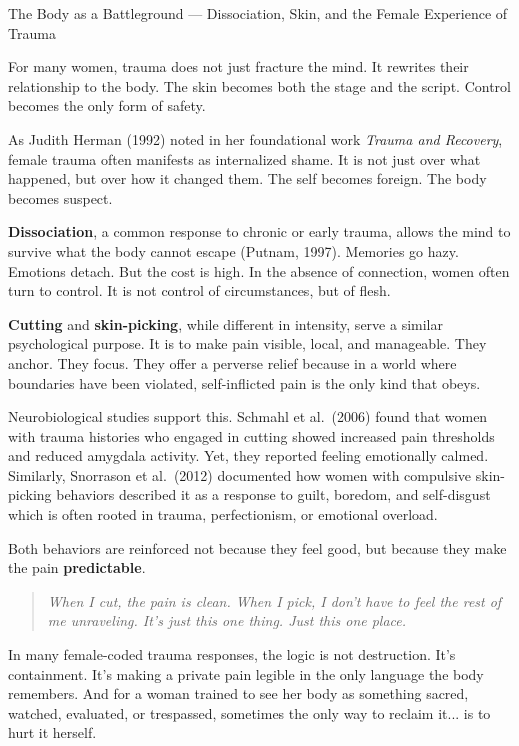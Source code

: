 \begin{PsychologicalSidebar}{The Body as a Battleground --- 
  Dissociation, Skin, and the Female Experience of Trauma}
  
  For many women, trauma does not just fracture the mind.  
  It rewrites their relationship to the body.  
  The skin becomes both the stage and the script.  
  Control becomes the only form of safety.
  
  \medskip
  
  As Judith Herman (1992) noted in her foundational work \textit{Trauma and Recovery}, 
  female trauma often manifests as internalized shame.
  It is not just over what happened, but over how it changed them.  
  The self becomes foreign.  
  The body becomes suspect.
  
  \medskip
  
  \textbf{Dissociation}, a common response to chronic or early trauma, 
  allows the mind to survive what the body cannot escape (Putnam, 1997).  
  Memories go hazy. Emotions detach.  
  But the cost is high.
  In the absence of connection, women often turn to control.
  It is not control of circumstances, but of flesh.
  
  \medskip
  
  \textbf{Cutting} and \textbf{skin-picking}, while different in intensity,  
  serve a similar psychological purpose.  
  It is to make pain visible, local, and manageable.  
  They anchor. They focus.  
  They offer a perverse relief
  because in a world where boundaries have been violated,  
  self-inflicted pain is the only kind that obeys.
  
  \medskip
  
  Neurobiological studies support this.  
  Schmahl et al.\ (2006) found that women with trauma histories 
  who engaged in cutting showed increased pain thresholds and reduced 
  amygdala activity. Yet, they reported feeling emotionally calmed.  
  Similarly, Snorrason et al.\ (2012) documented how women with compulsive 
  skin-picking behaviors described it as a response to guilt, boredom, and self-disgust
  which is often rooted in trauma, perfectionism, or emotional overload.
  
  \medskip
  
  Both behaviors are reinforced not because they feel good,
  but because they make the pain \textbf{predictable}.
  
  \begin{quote}
  \itshape
  When I cut, the pain is clean.  
  When I pick, I don’t have to feel the rest of me unraveling.  
  It’s just this one thing. Just this one place.
  \end{quote}
  
  \medskip
  
  In many female-coded trauma responses, the logic is not destruction.  
  It’s containment.  
  It’s making a private pain legible in the only language the body remembers.  
  And for a woman trained to see her body as something sacred, watched, evaluated, or 
  trespassed,  sometimes the only way to reclaim it... is to hurt it herself.
  
\end{PsychologicalSidebar}

